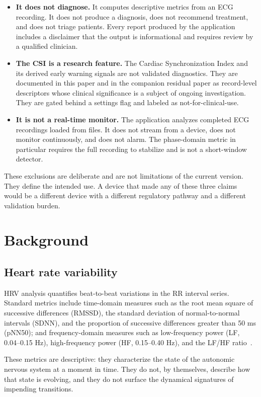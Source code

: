 \documentclass[11pt]{article}
\begin{document}
\begin{itemize}
\item \textbf{It does not diagnose.} It computes descriptive metrics
from an ECG recording. It does not produce a diagnosis, does not
recommend treatment, and does not triage patients. Every report
produced by the application includes a disclaimer that the output is
informational and requires review by a qualified clinician.
\item \textbf{The CSI is a research feature.} The Cardiac
Synchronization Index and its derived early warning signals are not
validated diagnostics. They are documented in this paper and in the
companion residual paper as record-level descriptors whose clinical
significance is a subject of ongoing investigation. They are gated
behind a settings flag and labeled as not-for-clinical-use.
\item \textbf{It is not a real-time monitor.} The application analyzes
completed ECG recordings loaded from files. It does not stream from a
device, does not monitor continuously, and does not alarm. The
phase-domain metric in particular requires the full recording to
stabilize and is not a short-window detector.
\end{itemize}

These exclusions are deliberate and are not limitations of the current
version. They define the intended use. A device that made any of these
three claims would be a different device with a different regulatory
pathway and a different validation burden.

\section{Background}

\subsection{Heart rate variability}

HRV analysis quantifies beat-to-beat variations in the RR interval
series. Standard metrics include time-domain measures such as the root
mean square of successive differences (RMSSD), the standard deviation
of normal-to-normal intervals (SDNN), and the proportion of successive
differences greater than 50 ms (pNN50); and frequency-domain measures
such as low-frequency power (LF, 0.04--0.15 Hz), high-frequency power
(HF, 0.15--0.40 Hz), and the LF/HF ratio~\cite{taskforce1996}.

These metrics are descriptive: they characterize the state of the
autonomic nervous system at a moment in time. They do not, by
themselves, describe how that state is evolving, and they do not
surface the dynamical signatures of impending transitions.
\end{document}
